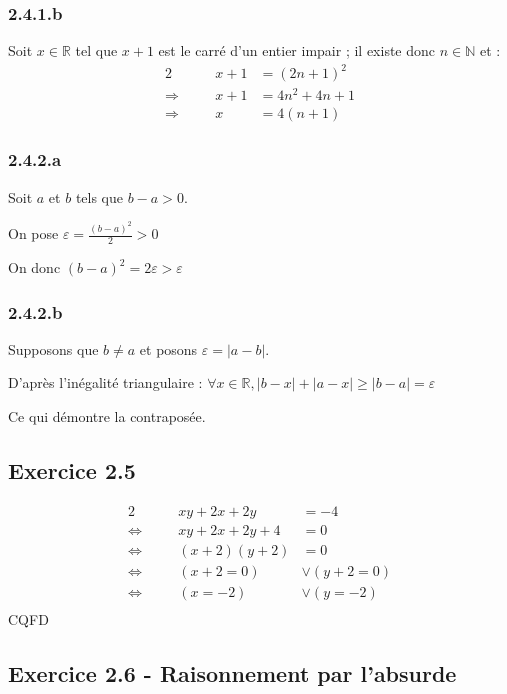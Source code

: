 \documentclass[a4paper,10pt]{report}
\begin{document}
\subsubsection*{2.4.1.b}

Soit $x \in \mathbb{R}$ tel que $x+1$ est le carré d'un entier impair ;
il existe donc $n \in \mathbb{N}$ et :
\begin{alignat*}{2}
	               &\quad & x+1 &=(2n+1)^2 \\
	\Longrightarrow&      & x+1 &= 4n^2 + 4n +1 \\
	\Longrightarrow&      &   x &= 4(n+1) 
\end{alignat*}

\subsubsection*{2.4.2.a}

Soit $a$ et $b$ tels que $b-a > 0$.

On pose $\varepsilon = \frac{(b-a)^2}{2} > 0$

On donc $(b-a)^2 = 2\varepsilon > \varepsilon$

\subsubsection*{2.4.2.b}

Supposons que $b \neq a$ et posons $\varepsilon = |a-b|$.

D'après l'inégalité triangulaire :
$\forall x \in \mathbb{R}, |b-x| + |a-x| \geq |b-a| = \varepsilon$

Ce qui démontre la contraposée.


\subsection*{Exercice 2.5}

\begin{alignat*}{2}
	                   &\quad & xy + 2x + 2y &=-4 \\
	\Longleftrightarrow&      & xy + 2x + 2y +4&=0 \\
	\Longleftrightarrow&      & (x+2)(y+2) & =0 \\
	\Longleftrightarrow&      & (x+2=0) &\vee (y+2=0) \\
	\Longleftrightarrow&      & (x=-2) &\vee (y=-2) \\
\end{alignat*}
CQFD

\subsection*{Exercice 2.6 - Raisonnement par l'absurde}
\end{document}
